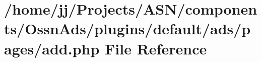 \hypertarget{components_2_ossn_ads_2plugins_2default_2ads_2pages_2add_8php}{}\section{/home/jj/\+Projects/\+A\+S\+N/components/\+Ossn\+Ads/plugins/default/ads/pages/add.php File Reference}
\label{components_2_ossn_ads_2plugins_2default_2ads_2pages_2add_8php}
